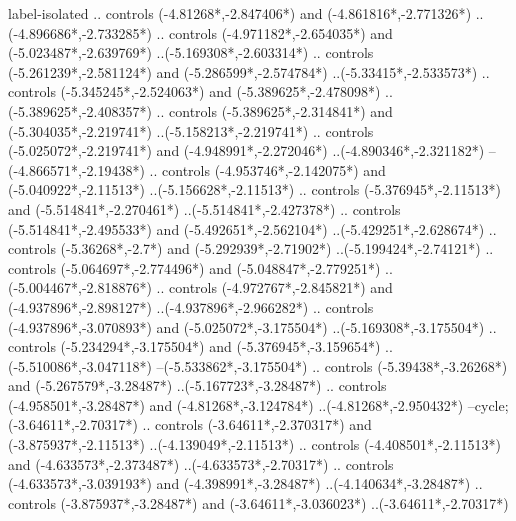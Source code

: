 {\begin{scope}[x=1mm,y=1mm,line width=\SCstroke mm,line cap=round,line join=round]
\begin{SCpart}{label-isolated}
.. controls ({-4.81268*\SCF},{-2.847406*\SCF}) and ({-4.861816*\SCF},{-2.771326*\SCF}) ..({-4.896686*\SCF},{-2.733285*\SCF})
.. controls ({-4.971182*\SCF},{-2.654035*\SCF}) and ({-5.023487*\SCF},{-2.639769*\SCF}) ..({-5.169308*\SCF},{-2.603314*\SCF})
.. controls ({-5.261239*\SCF},{-2.581124*\SCF}) and ({-5.286599*\SCF},{-2.574784*\SCF}) ..({-5.33415*\SCF},{-2.533573*\SCF})
.. controls ({-5.345245*\SCF},{-2.524063*\SCF}) and ({-5.389625*\SCF},{-2.478098*\SCF}) ..({-5.389625*\SCF},{-2.408357*\SCF})
.. controls ({-5.389625*\SCF},{-2.314841*\SCF}) and ({-5.304035*\SCF},{-2.219741*\SCF}) ..({-5.158213*\SCF},{-2.219741*\SCF})
.. controls ({-5.025072*\SCF},{-2.219741*\SCF}) and ({-4.948991*\SCF},{-2.272046*\SCF}) ..({-4.890346*\SCF},{-2.321182*\SCF})
--({-4.866571*\SCF},{-2.19438*\SCF})
.. controls ({-4.953746*\SCF},{-2.142075*\SCF}) and ({-5.040922*\SCF},{-2.11513*\SCF}) ..({-5.156628*\SCF},{-2.11513*\SCF})
.. controls ({-5.376945*\SCF},{-2.11513*\SCF}) and ({-5.514841*\SCF},{-2.270461*\SCF}) ..({-5.514841*\SCF},{-2.427378*\SCF})
.. controls ({-5.514841*\SCF},{-2.495533*\SCF}) and ({-5.492651*\SCF},{-2.562104*\SCF}) ..({-5.429251*\SCF},{-2.628674*\SCF})
.. controls ({-5.36268*\SCF},{-2.7*\SCF}) and ({-5.292939*\SCF},{-2.71902*\SCF}) ..({-5.199424*\SCF},{-2.74121*\SCF})
.. controls ({-5.064697*\SCF},{-2.774496*\SCF}) and ({-5.048847*\SCF},{-2.779251*\SCF}) ..({-5.004467*\SCF},{-2.818876*\SCF})
.. controls ({-4.972767*\SCF},{-2.845821*\SCF}) and ({-4.937896*\SCF},{-2.898127*\SCF}) ..({-4.937896*\SCF},{-2.966282*\SCF})
.. controls ({-4.937896*\SCF},{-3.070893*\SCF}) and ({-5.025072*\SCF},{-3.175504*\SCF}) ..({-5.169308*\SCF},{-3.175504*\SCF})
.. controls ({-5.234294*\SCF},{-3.175504*\SCF}) and ({-5.376945*\SCF},{-3.159654*\SCF}) ..({-5.510086*\SCF},{-3.047118*\SCF})
--({-5.533862*\SCF},{-3.175504*\SCF})
.. controls ({-5.39438*\SCF},{-3.26268*\SCF}) and ({-5.267579*\SCF},{-3.28487*\SCF}) ..({-5.167723*\SCF},{-3.28487*\SCF})
.. controls ({-4.958501*\SCF},{-3.28487*\SCF}) and ({-4.81268*\SCF},{-3.124784*\SCF}) ..({-4.81268*\SCF},{-2.950432*\SCF})
--cycle;
 ({-3.64611*\SCF},{-2.70317*\SCF})
.. controls ({-3.64611*\SCF},{-2.370317*\SCF}) and ({-3.875937*\SCF},{-2.11513*\SCF}) ..({-4.139049*\SCF},{-2.11513*\SCF})
.. controls ({-4.408501*\SCF},{-2.11513*\SCF}) and ({-4.633573*\SCF},{-2.373487*\SCF}) ..({-4.633573*\SCF},{-2.70317*\SCF})
.. controls ({-4.633573*\SCF},{-3.039193*\SCF}) and ({-4.398991*\SCF},{-3.28487*\SCF}) ..({-4.140634*\SCF},{-3.28487*\SCF})
.. controls ({-3.875937*\SCF},{-3.28487*\SCF}) and ({-3.64611*\SCF},{-3.036023*\SCF}) ..({-3.64611*\SCF},{-2.70317*\SCF})

\end{SCpart}
\end{scope}}
